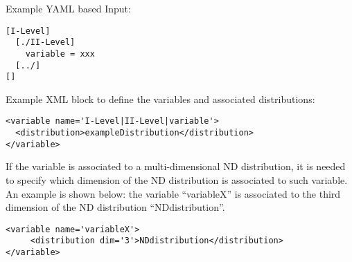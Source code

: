 Example YAML based Input:
\begin{lstlisting}
[I-Level]
  [./II-Level]
    variable = xxx
  [../]
[]
\end{lstlisting}

Example XML block to define the variables and associated distributions:
\begin{lstlisting}[style=XML]
<variable name='I-Level|II-Level|variable'>
  <distribution>exampleDistribution</distribution>
</variable>
\end{lstlisting}

If the variable is associated to a multi-dimensional ND distribution, it is needed to specify which dimension of the ND distribution is associated to such variable. An example is shown below: the variable  ``variableX'' is associated to the third dimension of the ND distribution ``NDdistribution''.

\begin{lstlisting}[style=XML]
<variable name='variableX'>
     <distribution dim='3'>NDdistribution</distribution>
</variable>
\end{lstlisting}

